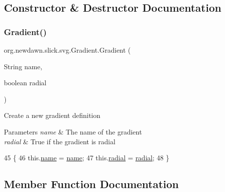 \subsection{Constructor \& Destructor Documentation}
\mbox{\label{classorg_1_1newdawn_1_1slick_1_1svg_1_1_gradient_a23077edba4cd72aa5afb3b1b6a98b71a}} 
\subsubsection{\texorpdfstring{Gradient()}{Gradient()}}
{\footnotesize\ttfamily org.\+newdawn.\+slick.\+svg.\+Gradient.\+Gradient (\begin{DoxyParamCaption}\item[{String}]{name,  }\item[{boolean}]{radial }\end{DoxyParamCaption})\hspace{0.3cm}{\ttfamily [inline]}}

Create a new gradient definition


\begin{DoxyParams}{Parameters}
{\em name} & The name of the gradient \\
\hline
{\em radial} & True if the gradient is radial \\
\hline
\end{DoxyParams}

\begin{DoxyCode}
45                                                  \{
46         this.\mbox{\hyperlink{classorg_1_1newdawn_1_1slick_1_1svg_1_1_gradient_a170cbb8709185dc426c216ba621f579f}{name}} = \mbox{\hyperlink{classorg_1_1newdawn_1_1slick_1_1svg_1_1_gradient_a170cbb8709185dc426c216ba621f579f}{name}};
47         this.\mbox{\hyperlink{classorg_1_1newdawn_1_1slick_1_1svg_1_1_gradient_a61d950bb9ea6a93f13772e9c536241a3}{radial}} = \mbox{\hyperlink{classorg_1_1newdawn_1_1slick_1_1svg_1_1_gradient_a61d950bb9ea6a93f13772e9c536241a3}{radial}};
48     \}
\end{DoxyCode}


\subsection{Member Function Documentation}
\mbox{\label{classorg_1_1newdawn_1_1slick_1_1svg_1_1_gradient_a2822c23173162e2003f051dabc6921c9}} 
